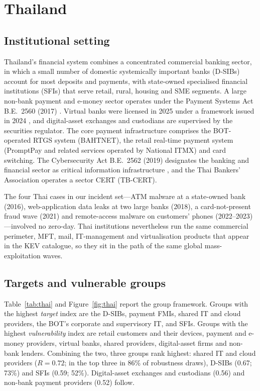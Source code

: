 \section{Thailand}\label{sec:thailand}

\subsection{Institutional setting}
Thailand's financial system combines a concentrated commercial banking sector, in which a small number of domestic systemically important banks (D-SIBs) account for most deposits and payments, with state-owned specialised financial institutions (SFIs) that serve retail, rural, housing and SME segments. A large non-bank payment and e-money sector operates under the Payment Systems Act B.E.~2560 (2017) \citep{thailand2017payment}. Virtual banks were licensed in 2025 under a framework issued in 2024 \citep{bot2024virtual}, and digital-asset exchanges and custodians are supervised by the securities regulator. The core payment infrastructure comprises the BOT-operated RTGS system (BAHTNET), the retail real-time payment system (PromptPay and related services operated by National ITMX) and card switching. The Cybersecurity Act B.E.~2562 (2019) designates the banking and financial sector as critical information infrastructure \citep{thailand2019cyber}, and the Thai Bankers' Association operates a sector CERT (TB-CERT).

The four Thai cases in our incident set---ATM malware at a state-owned bank (2016), web-application data leaks at two large banks (2018), a card-not-present fraud wave (2021) and remote-access malware on customers' phones (2022--2023)---involved no zero-day. Thai institutions nevertheless run the same commercial perimeter, MFT, mail, IT-management and virtualisation products that appear in the KEV catalogue, so they sit in the path of the same global mass-exploitation waves.

\subsection{Targets and vulnerable groups}
Table~\ref{tab:thai} and Figure~\ref{fig:thai} report the group framework. Groups with the highest \emph{target} index are the D-SIBs, payment FMIs, shared IT and cloud providers, the BOT's corporate and supervisory IT, and SFIs. Groups with the highest \emph{vulnerability} index are retail customers and their devices, payment and e-money providers, virtual banks, shared providers, digital-asset firms and non-bank lenders. Combining the two, three groups rank highest: shared IT and cloud providers ($R=0.72$; in the top three in 86\% of robustness draws), D-SIBs (0.67; 73\%) and SFIs (0.59; 52\%). Digital-asset exchanges and custodians (0.56) and non-bank payment providers (0.52) follow.

